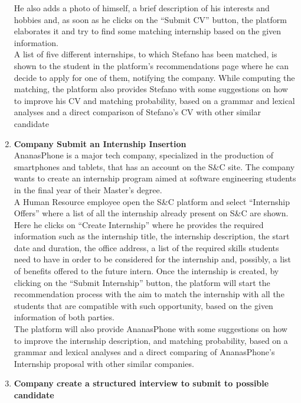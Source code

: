 \begin{enumerate}
        He also adds a photo of himself, a brief description of his interests and hobbies and, as soon as he clicks on the “Submit CV” button, the platform elaborates it and try to find some matching internship based on the given information.\\
        A list of five different internships, to which Stefano has been matched, is shown to the student in the platform's recommendations page where he can decide to apply for one of them, notifying the company.
        While computing the matching, the platform also provides Stefano with some suggestions on how to improve his CV and matching probability, based on a grammar and lexical analyses and a direct comparison of Stefano's CV with other similar candidate
    \item \textbf{\textcolor{titleColor}{Company Submit an Internship Insertion}}\\
        AnanasPhone is a major tech company, specialized in the production of smartphones and tablets, that has an account on the S\&C site. The company wants to create an internship program aimed at software engineering students in the final year of their Master's degree.\\
        A Human Resource employee open the S\&C platform and select “Internship Offers” where a list of all the internship already present on S\&C are shown. Here he clicks on “Create Internship” where he provides the required information such as the internship title, the internship description, the start date and duration, the office address, a list of the required skills students need to have in order to be considered for the internship and, possibly, a list of benefits offered to the future intern. Once the internship is created, by clicking on the “Submit Internship” button, the platform will start the recommendation process with the aim to match the internship with all the students that are compatible with such opportunity, based on the given information of both parties.\\
        The platform will also provide AnanasPhone with some suggestions on how to improve the internship description, and matching probability, based on a grammar and lexical analyses and a direct comparing of AnanasPhone's Internship proposal with other similar companies.
    \item \textbf{\textcolor{titleColor}{Company create a structured interview to submit to possible candidate}}\\

\end{enumerate}
